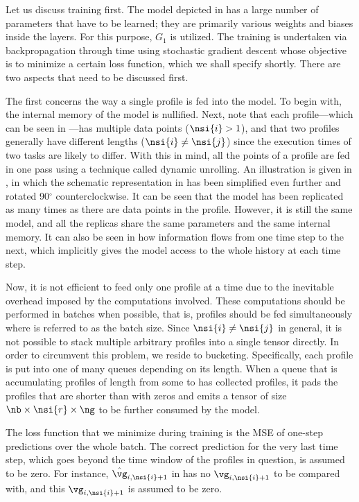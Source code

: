 Let us discuss training first. The model depicted in
 has a large number of parameters that have to be
learned; they are primarily various weights and biases inside the layers. For
this purpose, $G_1$ is utilized. The training is undertaken via backpropagation
through time using stochastic gradient descent \cite{goodfellow2016} whose
objective is to minimize a certain loss function, which we shall specify
shortly. There are two aspects that need to be discussed first.

The first concerns the way a single profile is fed into the model. To begin
with, the internal memory of the model is nullified. Next, note that each
profile---which can be seen in ---has multiple data points
($\nsi{i} > 1$), and that two profiles generally have different lengths
($\nsi{i} \neq \nsi{j}$) since the execution times of two tasks are likely to
differ. With this in mind, all the points of a profile are fed in one pass using
a technique called dynamic unrolling. An illustration is given in
, in which the schematic representation in
 has been simplified even further and rotated
90${}^\circ$ counterclockwise. It can be seen that the model has been replicated
as many times as there are data points in the profile. However, it is still the
same model, and all the replicas share the same parameters and the same internal
memory. It can also be seen in  how information flows
from one time step to the next, which implicitly gives the model access to the
whole history at each time step.

Now, it is not efficient to feed only one profile at a time due to the
inevitable overhead imposed by the computations involved. These computations
should be performed in batches when possible, that is, \nb profiles should be
fed simultaneously where \nb is referred to as the batch size. Since $\nsi{i}
\neq \nsi{j}$ in general, it is not possible to stack multiple arbitrary
profiles into a single tensor directly. In order to circumvent this problem, we
reside to bucketing. Specifically, each profile is put into one of many queues
depending on its length. When a queue that is accumulating profiles of length
from some  to  has collected \nb profiles, it pads the profiles
that are shorter than  with zeros and emits a tensor of size $\nb \times
\nsi{r} \times \ng$ to be further consumed by the model.

The loss function that we minimize during training is the \ac{MSE} of one-step
predictions over the whole batch. The correct prediction for the very last time
step, which goes beyond the time window of the profiles in question, is assumed
to be zero. For instance, $\hat{\vg}_{i, \nsi{i} + 1}$ in
 has no $\vg_{i, \nsi{i} + 1}$ to be compared with,
and this $\vg_{i, \nsi{i} + 1}$ is assumed to be zero.

